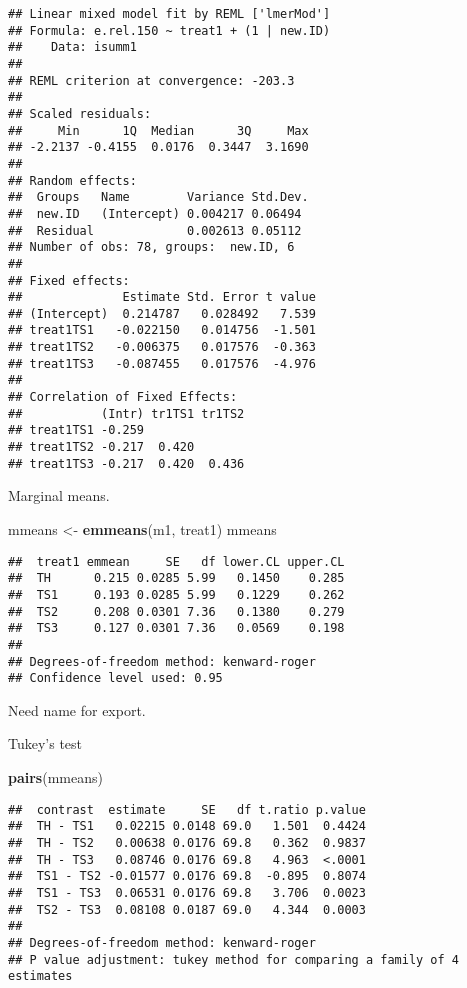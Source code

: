 \documentclass[
]{article}
\newenvironment{Shaded}{\begin{snugshade}}{\end{snugshade}}
\newcommand{\FunctionTok}[1]{\textcolor[rgb]{0.13,0.29,0.53}{\textbf{#1}}}
\newcommand{\NormalTok}[1]{#1}
\newcommand{\OtherTok}[1]{\textcolor[rgb]{0.56,0.35,0.01}{#1}}
\newcommand{\StringTok}[1]{\textcolor[rgb]{0.31,0.60,0.02}{#1}}
\begin{document}
\begin{verbatim}
## Linear mixed model fit by REML ['lmerMod']
## Formula: e.rel.150 ~ treat1 + (1 | new.ID)
##    Data: isumm1
## 
## REML criterion at convergence: -203.3
## 
## Scaled residuals: 
##     Min      1Q  Median      3Q     Max 
## -2.2137 -0.4155  0.0176  0.3447  3.1690 
## 
## Random effects:
##  Groups   Name        Variance Std.Dev.
##  new.ID   (Intercept) 0.004217 0.06494 
##  Residual             0.002613 0.05112 
## Number of obs: 78, groups:  new.ID, 6
## 
## Fixed effects:
##              Estimate Std. Error t value
## (Intercept)  0.214787   0.028492   7.539
## treat1TS1   -0.022150   0.014756  -1.501
## treat1TS2   -0.006375   0.017576  -0.363
## treat1TS3   -0.087455   0.017576  -4.976
## 
## Correlation of Fixed Effects:
##           (Intr) tr1TS1 tr1TS2
## treat1TS1 -0.259              
## treat1TS2 -0.217  0.420       
## treat1TS3 -0.217  0.420  0.436
\end{verbatim}

Marginal means.

\begin{Shaded}
\begin{Highlighting}[]
\NormalTok{mmeans }\OtherTok{\textless{}{-}} \FunctionTok{emmeans}\NormalTok{(m1, }\StringTok{\textquotesingle{}treat1\textquotesingle{}}\NormalTok{)}
\NormalTok{mmeans}
\end{Highlighting}
\end{Shaded}

\begin{verbatim}
##  treat1 emmean     SE   df lower.CL upper.CL
##  TH      0.215 0.0285 5.99   0.1450    0.285
##  TS1     0.193 0.0285 5.99   0.1229    0.262
##  TS2     0.208 0.0301 7.36   0.1380    0.279
##  TS3     0.127 0.0301 7.36   0.0569    0.198
## 
## Degrees-of-freedom method: kenward-roger 
## Confidence level used: 0.95
\end{verbatim}

Need name for export.

Tukey's test

\begin{Shaded}
\begin{Highlighting}[]
\FunctionTok{pairs}\NormalTok{(mmeans)}
\end{Highlighting}
\end{Shaded}

\begin{verbatim}
##  contrast  estimate     SE   df t.ratio p.value
##  TH - TS1   0.02215 0.0148 69.0   1.501  0.4424
##  TH - TS2   0.00638 0.0176 69.8   0.362  0.9837
##  TH - TS3   0.08746 0.0176 69.8   4.963  <.0001
##  TS1 - TS2 -0.01577 0.0176 69.8  -0.895  0.8074
##  TS1 - TS3  0.06531 0.0176 69.8   3.706  0.0023
##  TS2 - TS3  0.08108 0.0187 69.0   4.344  0.0003
## 
## Degrees-of-freedom method: kenward-roger 
## P value adjustment: tukey method for comparing a family of 4 estimates
\end{verbatim}
\end{document}
